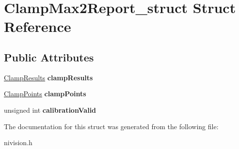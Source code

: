 \hypertarget{structClampMax2Report__struct}{
\section{ClampMax2Report\_\-struct Struct Reference}
\label{structClampMax2Report__struct}
}
\subsection*{Public Attributes}
\begin{DoxyCompactItemize}
\item 
\hypertarget{structClampMax2Report__struct_ad0af0e99222edb9165f4976d2c62bbc9}{
\hyperlink{structClampResults__struct}{ClampResults} {\bfseries clampResults}}
\label{structClampMax2Report__struct_ad0af0e99222edb9165f4976d2c62bbc9}

\item 
\hypertarget{structClampMax2Report__struct_aa06c20afc25176501097ab09d6814dfd}{
\hyperlink{structClampPoints__struct}{ClampPoints} {\bfseries clampPoints}}
\label{structClampMax2Report__struct_aa06c20afc25176501097ab09d6814dfd}

\item 
\hypertarget{structClampMax2Report__struct_a02f06edcbe964c345fde97787cbdfcab}{
unsigned int {\bfseries calibrationValid}}
\label{structClampMax2Report__struct_a02f06edcbe964c345fde97787cbdfcab}

\end{DoxyCompactItemize}


The documentation for this struct was generated from the following file:\begin{DoxyCompactItemize}
\item 
nivision.h\end{DoxyCompactItemize}
